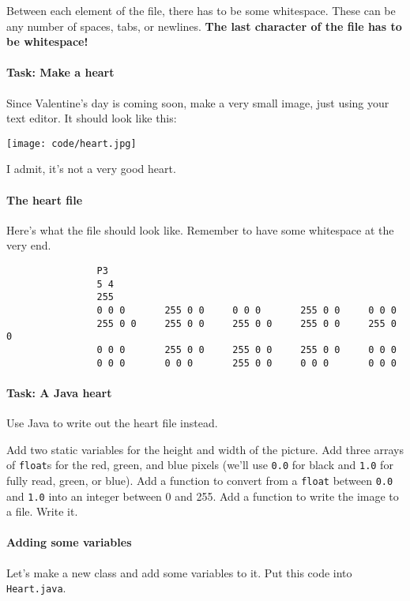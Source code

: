 \documentclass{article}
\begin{document}
            Between each element of the file, there has to be some whitespace. These can be any number of spaces, tabs, or newlines.
            \textbf{The last character of the file has to be whitespace!}
        
        \paragraph{Task: Make a heart}
            
            Since Valentine's day is coming soon, make a very small image, just using your text editor.  It should look like this:

                \texttt{[image: code/heart.jpg]}
        
            I admit, it's not a very good heart.
            
        \paragraph{The heart file}
            Here's what the file should look like.  Remember to have some whitespace at the very end.
            \begin{verbatim}
                P3
                5 4
                255
                0 0 0       255 0 0     0 0 0       255 0 0     0 0 0 
                255 0 0     255 0 0     255 0 0     255 0 0     255 0 0
                0 0 0       255 0 0     255 0 0     255 0 0     0 0 0
                0 0 0       0 0 0       255 0 0     0 0 0       0 0 0
            \end{verbatim}            

        \paragraph{Task: A Java heart}
            Use Java to write out the heart file instead.  
            
            Add two static variables for the height and width of the picture. Add three arrays of \texttt{float}s for the red, green, and
            blue pixels (we'll use \texttt{0.0} for black and \texttt{1.0} for fully read, green, or blue). Add a function to convert from
            a \texttt{float} between \texttt{0.0} and \texttt{1.0} into an integer between 0 and 255. Add a function to write the image to
            a file. Write it.
        
        \paragraph{Adding some variables}
            Let's make a new class and add some variables to it.  Put this code into \texttt{Heart.java}.
            
\end{document}
